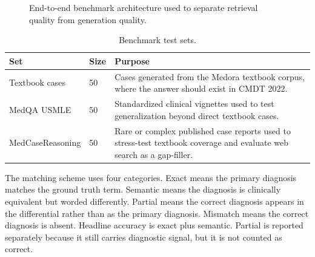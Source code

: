 \begin{figure}[htbp]
\centering
{}
\caption{End-to-end benchmark architecture used to separate retrieval quality from generation quality.}
\label{fig:benchmark_architecture}
\end{figure}

\begin{table}[htbp]
\centering
\caption{Benchmark test sets.}
\label{tab:benchmark_test_sets}
\begin{tabular}{p{} p{} p{}}
\toprule
\textbf{Set} & \textbf{Size} & \textbf{Purpose}\\
\midrule
Textbook cases & 50 & Cases generated from the Medora textbook corpus, where the answer should exist in CMDT 2022.\\
MedQA USMLE & 50 & Standardized clinical vignettes used to test generalization beyond direct textbook cases.\\
MedCaseReasoning & 50 & Rare or complex published case reports used to stress-test textbook coverage and evaluate web search as a gap-filler.\\
\bottomrule
\end{tabular}
\end{table}

The matching scheme uses four categories. Exact means the primary diagnosis matches the ground truth term. Semantic means the diagnosis is clinically equivalent but worded differently. Partial means the correct diagnosis appears in the differential rather than as the primary diagnosis. Mismatch means the correct diagnosis is absent. Headline accuracy is exact plus semantic. Partial is reported separately because it still carries diagnostic signal, but it is not counted as correct.

